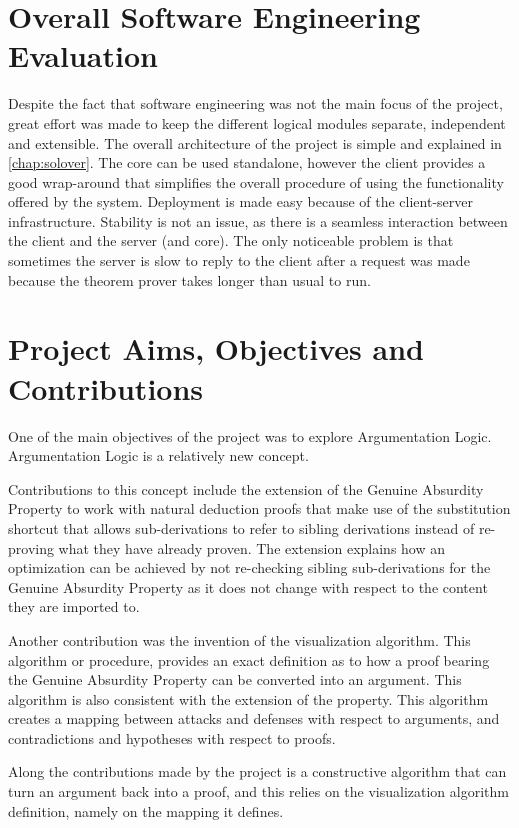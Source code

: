 \documentclass[11pt,twoside,a4paper]{report}
\begin{document}
\section{Overall Software Engineering Evaluation}
Despite the fact that software engineering was not the main focus of the project, great effort was made to keep the different logical modules separate, independent and extensible. The overall architecture of the project is simple and explained in \autoref{chap:solover}. The core can be used standalone, however the client provides a good wrap-around that simplifies the overall procedure of using the functionality offered by the system. Deployment is made easy because of the client-server infrastructure. Stability is not an issue, as there is a seamless interaction between the client and the server (and core). The only noticeable problem is that sometimes the server is slow to reply to the client after a request was made because the theorem prover takes longer than usual to run.

\section{Project Aims, Objectives and Contributions}
\label{sec:contrib}
One of the main objectives of the project was to explore Argumentation Logic. Argumentation Logic is a relatively new concept. 

Contributions to this concept include the extension of the Genuine Absurdity Property to work with natural deduction proofs that make use of the substitution shortcut that allows sub-derivations to refer to sibling derivations instead of re-proving what they have already proven. The extension explains how an optimization can be achieved by not re-checking sibling sub-derivations for the Genuine Absurdity Property as it does not change with respect to the content they are imported to.

Another contribution was the invention of the visualization algorithm. This algorithm or procedure, provides an exact definition as to how a proof bearing the Genuine Absurdity Property can be converted into an argument. This algorithm is also consistent with the extension of the property. This algorithm creates a mapping between attacks and defenses with respect to arguments, and contradictions and hypotheses with respect to proofs.

Along the contributions made by the project is a constructive algorithm that can turn an argument back into a proof, and this relies on the visualization algorithm definition, namely on the mapping it defines.
\end{document}
